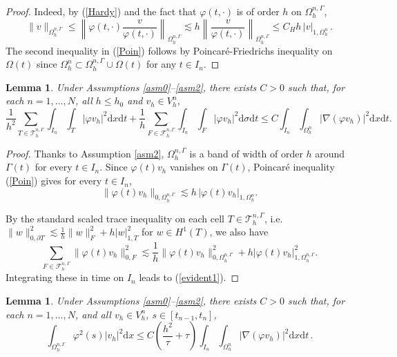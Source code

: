 \documentclass[11pt,a4paper]{article}
\theoremstyle{plain}
\newtheorem{lemma}[theorem]{Lemma}%
\theoremstyle{definition}
\theoremstyle{remark}
\numberwithin{equation}{section}
\newcommand{\dx}{\mathrm{d}x}
\newcommand{\dsigma}{\mathrm{d}\sigma}
\newcommand{\dt}{\mathrm{d}t}
\begin{document}
\begin{proof}
Indeed, by (\ref{Hardy}) and the fact that $\varphi(t,\cdot)$ is of order $h$ on $\Omega_h^{n,\Gamma}$,
$$
\|v\|_{\Omega_h^{n,\Gamma}}   \le \left\| \varphi(t,\cdot)\frac{v}{\varphi(t,\cdot)} \right\|_{\Omega_h^{n,\Gamma}} \lesssim h\left\| \frac{v}{\varphi(t,\cdot)} \right\|_{\Omega_h^{n,\Gamma}} \leqslant C_H h\, |v|_{1,\Omega_h^n}\,.
$$
The second inequality in (\ref{Poin}) follows by  Poincaré-Friedrichs inequality on $\Omega(t)$ since $\Omega_h^{n}\subset\Omega_h^{n,\Gamma}\cup\Omega(t)$ for any $t\in I_n$.
\end{proof}


\begin{lemma}
  \label{LemInverse}Under Assumptions {\ref{asm0}--\ref{asm2}}, there exists $C>0$ such that, for each $n=1,\ldots,N$, {all $h\leqslant h_0$} and $v_h \in  V_h^n$,
  \begin{equation}
    \frac{1}{h^2}  \sum_{T\in\mathcal{T}_h^{n,\Gamma}}\int_{I_n} \int_{T} | \varphi v_h |^2
    \dx \dt + \frac{1}{h} \sum_{F\in\mathcal{F}_h^{n, \Gamma}}   \int_{I_n} \int_{F} | \varphi v_h |^2 \dsigma \dt \leqslant C \int_{I_n}
    \int_{\Omega^n_h} | \nabla (\varphi v_h) |^2 \dx \dt.
    \label{evident1}
  \end{equation}
\end{lemma}

\begin{proof}  {Thanks to Assumption \ref{asm2},} $\Omega_h^{n, \Gamma}$ is a band of  width of order $h$ around $\Gamma (t)$ for every $t\in I_n$. Since $\varphi(t) v_h$ vanishes on
	$\Gamma(t)$, Poincar{\'e} inequality (\ref{Poin}) gives for every $t\in I_n$,
	\[ \| \varphi(t) v_h \|_{0, \Omega_h^{n, \Gamma}} \lesssim h\, | \varphi(t) v_h |_{1,\Omega_h^{n}}. \]
	
  By the standard scaled trace inequality {on each cell $T\in\mathcal{T}_h^{n,\Gamma}$, i.e. $\|w\|^2_{0,\partial T}\lesssim \frac1h\|w\|^2_{F}+h|w|^2_{1,T}$ for $w\in H^1(T)$}, we also have
  \[ \sum_{F\in\mathcal{F}_h^{n, \Gamma}}  \| \varphi(t) v_h \|_{0, F}^2 \lesssim \frac{1}{h} \|
     \varphi(t) v_h \|_{0, \Omega_h^{n, \Gamma}}^2 + h | \varphi(t) v_h |^2_{1,\Omega_h^{n, \Gamma}}. \]
  Integrating these in time on $I_n$ leads to (\ref{evident1}).
\end{proof}

\begin{lemma}
  \label{LemInverseT}Under Assumptions {\ref{asm0}--\ref{asm2}}, there exists $C>0$ such that, for each $n=1,\ldots,N$, {and all $v_h \in  V_h^n$,  $s\in[t_{n-1},t_n]$,}
\begin{equation}
    {\int_{\Omega_h^{n,\Gamma}}} \varphi^2 (s) |v_h |^2 \dx
    \leqslant C {\left(\frac{h^2}{\tau}+\tau\right)}  \int_{I_n} \int_{\Omega^n_h} | \nabla (\varphi v_h) |^2 \dx \dt \,. \label{evident2}
  \end{equation}
\end{lemma}
\end{document}
